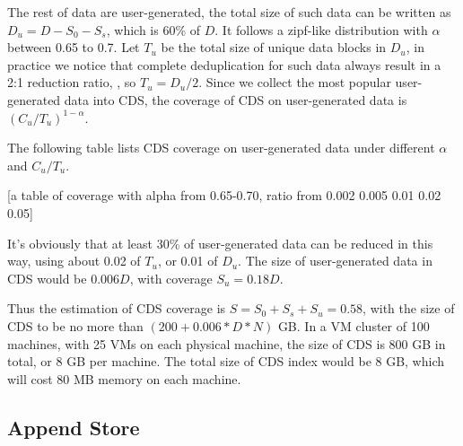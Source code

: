 The rest of data are user-generated, the total size of such data can be written as $D_u=D-S_0-S_s$, which is 60\% of $D$. 
It follows a zipf-like distribution with $\alpha$ between 0.65 to 0.7. 
Let $T_u$ be the total size of unique data blocks in $D_u$,
in practice we notice that complete deduplication for such data always result in a 2:1 reduction ratio,
, so $T_u=D_u/2$.
Since we collect the most popular user-generated data into CDS, the coverage of CDS on user-generated data
is $(C_u/T_u)^{1-\alpha}$.

The following table lists CDS coverage on user-generated data under different $\alpha$ and $C_u/T_u$.

[a table of coverage with alpha from 0.65-0.70, ratio from 0.002 0.005 0.01 0.02 0.05]

It's obviously that at least 30\% of user-generated data can be reduced in this way, using about 0.02 of $T_u$, or 0.01 of $D_u$.
The size of user-generated data in CDS would be 0.006$D$, with coverage $S_u=0.18D$.

Thus the estimation of CDS coverage is $S=S_0+S_s+S_u=0.58$, with the size of CDS to be no more than $(200 + 0.006*D*N)$ GB.
In a VM cluster of 100 machines, with 25 VMs on each physical machine, the size of CDS is 800 GB in total, or 8 GB per machine.
The total size of CDS index would be 8 GB, which will cost 80 MB memory on each machine. 

\subsection{Append Store}
